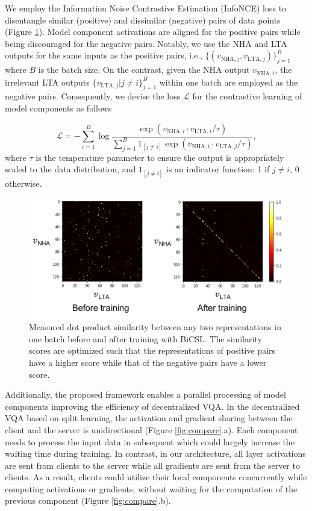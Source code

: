 \documentclass[letterpaper]{article} %
\begin{document}
We employ the Information Noise Contrastive Estimation (InfoNCE) loss \cite{infonce} to disentangle similar (positive) and dissimilar (negative) pairs of data points (Figure \ref{fig:heat}). Model component activations are aligned for the positive pairs while being discouraged for the negative pairs. Notably, we use the NHA and LTA outputs for the same inputs as the positive pairs, i.e., $\{(v_{\text{NHA},j},v_{\text{LTA},j})\}_{j=1}^B$ where $B$ is the batch size. On the contrast, given the NHA output $v_{\text{NHA},i}$, the irrelevant LTA outputs $\{v_{\text{LTA},j}|j\neq i\}_{j=1}^B$ within one batch are employed as the negative pairs. Consequently, we devise the loss $\mathcal{L}$ for the contrastive learning of model components as follows 

\begin{equation}
        \mathcal{L}= -\sum_{i=1}^{B}\log\frac{\exp(v_{\text{NHA},i} \cdot v_{\text{LTA},i} / \tau)}{\sum_{j=1}^{B} {1}_{[j \neq i]} \exp(v_{\text{NHA},i} \cdot v_{\text{LTA},j} / \tau)},
\end{equation}
where $\tau$ is the temperature parameter to ensure the output is appropriately scaled to the data distribution, and ${1}_{[j \neq i]}$ is an indicator function: 1 if $j \neq i$, 0 otherwise. 

\begin{figure}[!t]
\centering
    \includegraphics[width=\linewidth]{figures/heat.pdf}
    \caption{Measured dot product similarity between any two representations in one batch before and after training with BiCSL. The similarity scores are optimized such that the representations of positive pairs have a higher score while that of the negative pairs have a lower score.}
    \label{fig:heat}
\end{figure}

Additionally, the proposed framework enables a parallel processing of model components improving the efficiency of decentralized VQA. In the decentralized VQA based on split learning, the activation and gradient sharing between the client and the server is unidirectional (Figure \ref{fig:compare}.a). Each component needs to process the input data in subsequent which could largely increase the waiting time during training. In contrast, in our architecture, all layer activations are sent from clients to the server while all gradients are sent from the server to clients. As a result, clients could utilize their local components concurrently while computing activations or gradients, without waiting for the computation of the previous component (Figure \ref{fig:compare}.b). 
\end{document}

